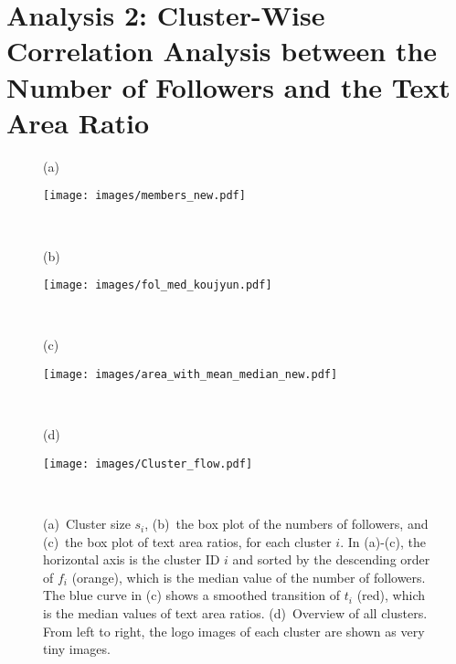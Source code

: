 \documentclass[runningheads]{llncs}
\begin{document}
\section{Analysis 2: Cluster-Wise Correlation Analysis between the Number of Followers and the Text Area Ratio}
%
%
\begin{figure}[t]
    \centering
    \begin{minipage}{0.03\textwidth}(a)\end{minipage}
    \begin{minipage}{0.95\textwidth}\hfill
    \texttt{[image: images/members\_new.pdf]}
    \end{minipage}\\[-1mm]
    \begin{minipage}{0.03\textwidth} (b)\end{minipage}
    \begin{minipage}{0.95\textwidth}\hfill
    \texttt{[image: images/fol\_med\_koujyun.pdf]}
    \end{minipage}\\[-1mm]
    \begin{minipage}{0.03\textwidth}(c)\end{minipage}
    \begin{minipage}{0.95\textwidth}\hfill
    \texttt{[image: images/area\_with\_mean\_median\_new.pdf]}
    \end{minipage}\\[-1mm]
    \begin{minipage}{0.03\textwidth}(d)\end{minipage}
    \begin{minipage}{0.95\textwidth}\hfill
    \texttt{[image: images/Cluster\_flow.pdf]}\\[-3mm]
    \end{minipage}\\[-1mm]    
  
    \caption{(a)~Cluster size $s_i$, (b)~the box plot of the numbers of followers, and (c)~the box plot of text area ratios, for each cluster $i$. In (a)-(c), the horizontal axis is the cluster ID $i$ and sorted by the descending order of $f_i$ (orange), which is the median value of the number of followers. The blue curve in (c) shows a smoothed transition of $t_i$ (red), which is the median values of text area ratios. (d)~Overview of all clusters. From left to right, the logo images of each cluster are shown as very tiny images.}
    \label{fig:cluster-wise-area-distribution.}
\end{figure}
\end{document}
